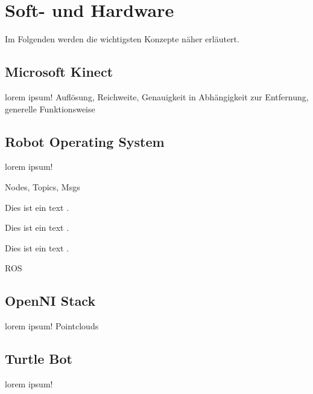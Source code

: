 \section{Soft- und Hardware}
\label{sec:softundhardware}

Im Folgenden werden die wichtigsten Konzepte näher erläutert.

\subsection{Microsoft Kinect}
{\color{red}lorem ipsum!}
{\color{red}Auflösung, Reichweite, Genauigkeit in Abhängigkeit zur Entfernung, generelle Funktionsweise}

\subsection{Robot Operating System}
{\color{red}lorem ipsum!}

{\color{red}Nodes, Topics, Msgs}

Dies ist ein text \cite[S. 12ff]{Quigley:2009kx}.

Dies ist ein text \cite[S. 12ff]{Quigley:2009kx}.

Dies ist ein text \cite{Will:2011vn}.

\gls{ROS}

\subsection{OpenNI Stack}
{\color{red}lorem ipsum!}
Pointclouds

\subsection{Turtle Bot}
{\color{red}lorem ipsum!}